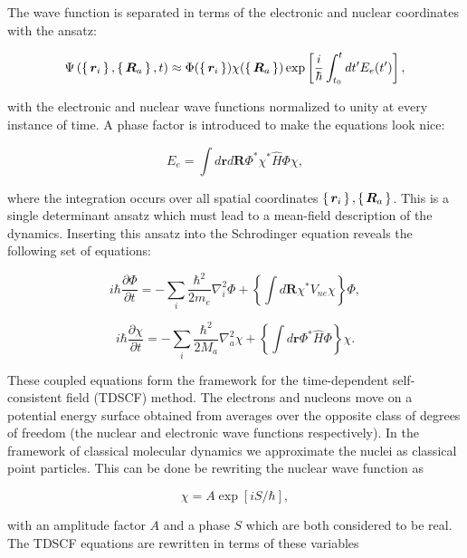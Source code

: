 The wave function is separated in terms of the electronic and nuclear
coordinates with the ansatz:

\begin{equation}
 \Psi \left(\set{\bm{r}_i}, \set{\bm{R}_a}, t \right)
    \approx \Phi(\set{\bm{r}_i}) \chi(\set{\bm{R}_a})
    \exp \left[ \frac{i}{\hbar} \int_{t_0}^t
    dt' E_e(t') \right] ,
\end{equation}

with the electronic and nuclear wave functions normalized to unity
at every instance of time. A phase factor is introduced to make
the equations look nice:

\begin{equation}
 E_e = \int d\bm{r} d\bm{R} \Phi^* \chi^* \hat{H} \Phi \chi , 
\end{equation}

where the integration occurs over all spatial coordinates
$\set{\bm{r}_i}, \set{\bm{R}_a}$. This is a single determinant
ansatz which must lead to a mean-field description of the dynamics.
Inserting this ansatz into the Schrodinger equation
reveals the following set of equations:

\begin{equation}
 i\hbar \frac{\partial \Phi}{\partial t}
    = -\sum_i \frac{\hbar^2}{2m_e} \nabla_i^2 \Phi
    + \left\{ \int d\bm{R} \chi^* V_{ne} \chi \right\} \Phi , 
\end{equation}

\begin{equation}
 i\hbar \frac{\partial \chi}{\partial t}
    = -\sum_i \frac{\hbar^2}{2M_a} \nabla_a^2 \chi
    + \left\{ \int d\bm{r} \Phi^* \hat{H} \Phi \right\} \chi . 
\end{equation}

These coupled equations form the framework for the
time-dependent self-consistent field (TDSCF) method.
The electrons and nucleons move on a potential energy surface
obtained from averages over the opposite class of
degrees of freedom (the nuclear and electronic wave functions
respectively).
In the framework of classical molecular dynamics
we approximate the nuclei as classical point particles.
This can be done be rewriting the nuclear wave function as

\begin{equation}
 \chi = A \exp[iS/\hbar] , 
\end{equation}

with an amplitude factor $A$ and a phase $S$
which are both considered to be real.
The TDSCF equations are rewritten in terms of these variables


